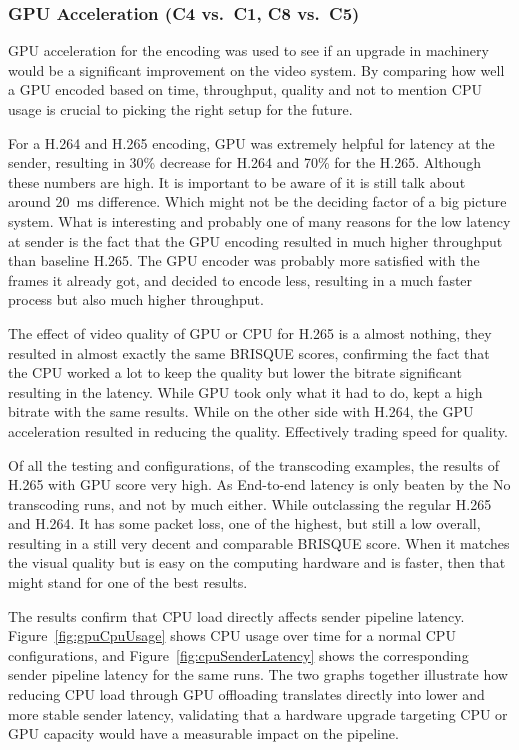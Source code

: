 \subsubsection{GPU Acceleration (C4 vs.\ C1, C8 vs.\ C5)}\label{subsubsec:gpu}
GPU acceleration for the encoding was used to see if an upgrade in machinery would be a significant improvement on the video system. By comparing how well a GPU encoded based on time, throughput, quality and not to mention CPU usage is crucial to picking the right setup for the future. 

For a H.264 and H.265 encoding, GPU was extremely helpful for latency at the sender, resulting in 30\% decrease for H.264 and 70\% for the H.265. Although these numbers are high. It is important to be aware of it is still talk about around 20~ms difference. Which might not be the deciding factor of a big picture system. What is interesting and probably one of many reasons for the low latency at sender is the fact that the GPU encoding resulted in much higher throughput than baseline H.265. The GPU encoder was probably more satisfied with the frames it already got, and decided to encode less, resulting in a much faster process but also much higher throughput.

The effect of video quality of GPU or CPU for H.265 is a almost nothing, they resulted in almost exactly the same BRISQUE scores, confirming the fact that the CPU worked a lot to keep the quality but lower the bitrate significant resulting in the latency. While GPU took only what it had to do, kept a high bitrate with the same results. While on the other side with H.264, the GPU acceleration resulted in reducing the quality. Effectively trading speed for quality.

Of all the testing and configurations, of the transcoding examples, the results of H.265 with GPU score very high. As End-to-end latency is only beaten by the No transcoding runs, and not by much either. While outclassing the regular H.265 and H.264. It has some packet loss, one of the highest, but still a low overall, resulting in a still very decent and comparable BRISQUE score. When it matches the visual quality but is easy on the computing hardware and is faster, then that might stand for one of the best results.

The results confirm that CPU load directly affects sender pipeline latency. Figure~\ref{fig:gpuCpuUsage} shows CPU usage over time for a normal CPU configurations, and Figure~\ref{fig:cpuSenderLatency} shows the corresponding sender pipeline latency for the same runs. The two graphs together illustrate how reducing CPU load through GPU offloading translates directly into lower and more stable sender latency, validating that a hardware upgrade targeting CPU or GPU capacity would have a measurable impact on the pipeline.

